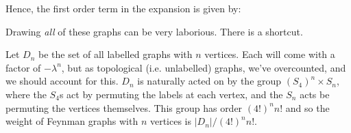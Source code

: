 \documentclass{jknotes}
\begin{document}
Hence, the first order term in the expansion is given by:
\begin{figure}[H]
    \centering
\end{figure}
Drawing \emph{all} of these graphs can be very laborious. There is a shortcut.

Let \(D_n\) be the set of all labelled graphs with \(n\) vertices. Each will come with a factor of \(-\lambda^n\), but as topological (i.e. unlabelled) graphs, we've overcounted, and we should account for this. \(D_n\) is naturally acted on by the group \((S_4)^n\times S_n\), where the \(S_4\)s act by permuting the labels at each vertex, and the \(S_n\) acts be permuting the vertices themselves. This group has order \((4!)^nn!\) and so the weight of Feynman graphs with
\(n\) vertices is \(|D_n|/(4!)^nn!\).
\end{document}
